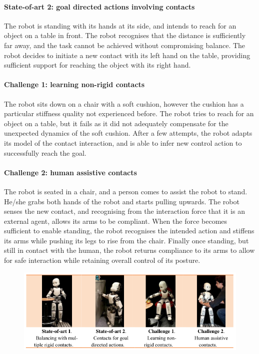 \documentclass[final,5p,twocolumn]{elsarticle}
\begin{document}
\paragraph{State-of-art 2: goal directed actions involving contacts} The robot is standing with its hands at its side, and intends to reach for an object on a table in front.  The robot recognises that the distance is sufficiently far away, and the task cannot be achieved without compromising balance.  The robot decides to initiate a new contact with its left hand on the table, providing sufficient support for reaching the object with its right hand.

\paragraph{Challenge 1: learning non-rigid contacts} The robot sits down on a chair with a soft cushion, however the cushion has a particular stiffness quality not experienced before. The robot tries to reach for an object on a table, but it fails as it did not adequately compensate for the unexpected dynamics of the soft cushion. After a few attempts, the robot adapts its model of the contact interaction, and is able to infer new control action to successfully reach the goal.

\paragraph{Challenge 2: human assistive contacts} The robot is seated in a chair, and a person comes to assist the robot to stand. He/she grabs both hands of the robot and starts pulling upwards.  The robot senses the new contact, and recognising from the interaction force that it is an external agent, allows its arms to be compliant.  When the force becomes sufficient to enable standing, the robot recognises the intended action and stiffens its arms while pushing its legs to rise from the chair. Finally once standing, but still in contact with the human, the robot returns compliance to its arms to allow for safe interaction while retaining overall control of its posture.

\begin{figure}
\centering
\includegraphics[width=1.0\linewidth]{./images/scenarios.png}
\label{fig:scenarios}
\end{figure}
\end{document}
